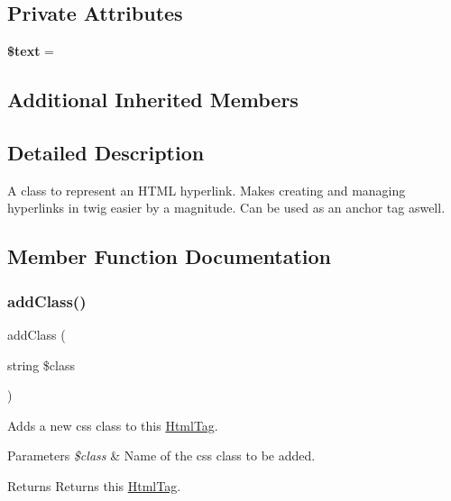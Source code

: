 \subsection*{Private Attributes}
\begin{DoxyCompactItemize}
\item 
\mbox{\label{class_html_1_1_link_adf95f30eaafccead90ab5e2cdb55e9b9}} 
{\bfseries \$text} = \textquotesingle{}\textquotesingle{}
\end{DoxyCompactItemize}
\subsection*{Additional Inherited Members}


\subsection{Detailed Description}
A class to represent an H\+T\+ML hyperlink. Makes creating and managing hyperlinks in twig easier by a magnitude. Can be used as an anchor tag aswell. 

\subsection{Member Function Documentation}
\mbox{\label{class_html_1_1_link_a45453935ed565c45623fb7b8b8c9810b}} 
\subsubsection{\texorpdfstring{add\+Class()}{addClass()}}
{\footnotesize\ttfamily add\+Class (\begin{DoxyParamCaption}\item[{string}]{\$class }\end{DoxyParamCaption})}

Adds a new css class to this \hyperlink{class_html_1_1_html_tag}{Html\+Tag}. 
\begin{DoxyParams}{Parameters}
{\em \$class} & Name of the css class to be added. \\
\hline
\end{DoxyParams}
\begin{DoxyReturn}{Returns}
Returns this \hyperlink{class_html_1_1_html_tag}{Html\+Tag}. 
\end{DoxyReturn}


